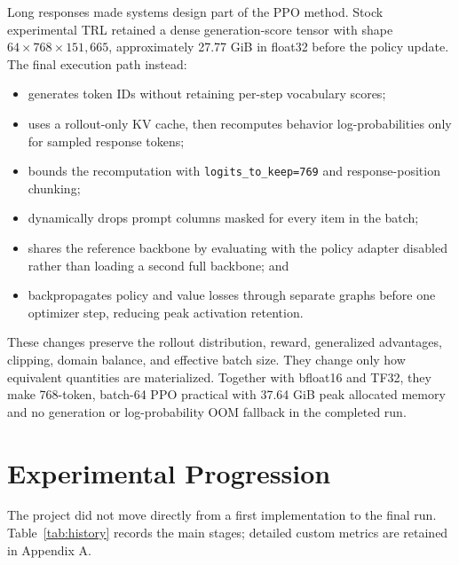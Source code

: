 \documentclass[11pt]{article}
\newcommand{\trl}{\textsc{TRL}}
\begin{document}
Long responses made systems design part of the PPO method. Stock experimental
\trl{} retained a dense generation-score tensor with shape
$64\times768\times151{,}665$, approximately 27.77 GiB in float32 before the
policy update. The final execution path instead:

\begin{itemize}
  \item generates token IDs without retaining per-step vocabulary scores;
  \item uses a rollout-only KV cache, then recomputes behavior log-probabilities
  only for sampled response tokens;
  \item bounds the recomputation with \texttt{logits\_to\_keep=769} and
  response-position chunking;
  \item dynamically drops prompt columns masked for every item in the batch;
  \item shares the reference backbone by evaluating with the policy adapter
  disabled rather than loading a second full backbone; and
  \item backpropagates policy and value losses through separate graphs before
  one optimizer step, reducing peak activation retention.
\end{itemize}

These changes preserve the rollout distribution, reward, generalized
advantages, clipping, domain balance, and effective batch size. They change
only how equivalent quantities are materialized. Together with bfloat16 and
TF32, they make 768-token, batch-64 PPO practical with 37.64 GiB peak allocated
memory and no generation or log-probability OOM fallback in the completed run.

\section{Experimental Progression}

The project did not move directly from a first implementation to the final
run. Table~\ref{tab:history} records the main stages; detailed custom metrics
are retained in Appendix A.
\end{document}
